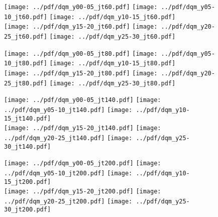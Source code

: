\documentclass[landscape,10pt]{beamer} %
\begin{document}
\newpage

\begin{figure}[p]
\centering
\texttt{[image: ../pdf/dqm\_y00-05\_jt60.pdf]}
\texttt{[image: ../pdf/dqm\_y05-10\_jt60.pdf]}
\texttt{[image: ../pdf/dqm\_y10-15\_jt60.pdf]}\\
\texttt{[image: ../pdf/dqm\_y15-20\_jt60.pdf]}
\texttt{[image: ../pdf/dqm\_y20-25\_jt60.pdf]}
\texttt{[image: ../pdf/dqm\_y25-30\_jt60.pdf]}
\end{figure}

\newpage

\begin{figure}[p]
\centering
\texttt{[image: ../pdf/dqm\_y00-05\_jt80.pdf]}
\texttt{[image: ../pdf/dqm\_y05-10\_jt80.pdf]}
\texttt{[image: ../pdf/dqm\_y10-15\_jt80.pdf]}\\
\texttt{[image: ../pdf/dqm\_y15-20\_jt80.pdf]}
\texttt{[image: ../pdf/dqm\_y20-25\_jt80.pdf]}
\texttt{[image: ../pdf/dqm\_y25-30\_jt80.pdf]}
\end{figure}

\newpage

\begin{figure}[p]
\centering
\texttt{[image: ../pdf/dqm\_y00-05\_jt140.pdf]}
\texttt{[image: ../pdf/dqm\_y05-10\_jt140.pdf]}
\texttt{[image: ../pdf/dqm\_y10-15\_jt140.pdf]}\\
\texttt{[image: ../pdf/dqm\_y15-20\_jt140.pdf]}
\texttt{[image: ../pdf/dqm\_y20-25\_jt140.pdf]}
\texttt{[image: ../pdf/dqm\_y25-30\_jt140.pdf]}
\end{figure}

\newpage

\begin{figure}[p]
\centering
\texttt{[image: ../pdf/dqm\_y00-05\_jt200.pdf]}
\texttt{[image: ../pdf/dqm\_y05-10\_jt200.pdf]}
\texttt{[image: ../pdf/dqm\_y10-15\_jt200.pdf]}\\
\texttt{[image: ../pdf/dqm\_y15-20\_jt200.pdf]}
\texttt{[image: ../pdf/dqm\_y20-25\_jt200.pdf]}
\texttt{[image: ../pdf/dqm\_y25-30\_jt200.pdf]}
\end{figure}
\end{document}

